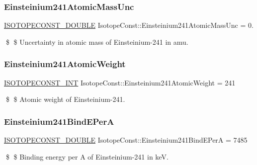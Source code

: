 \subsubsection{\texorpdfstring{Einsteinium241\+Atomic\+Mass\+Unc}{Einsteinium241AtomicMassUnc}}
{\footnotesize\ttfamily \mbox{\hyperlink{group___isotope_const-_macros_ga8f45a7272ce02c0b4c65c44636ed719a}{I\+S\+O\+T\+O\+P\+E\+C\+O\+N\+S\+T\+\_\+\+D\+O\+U\+B\+LE}} Isotope\+Const\+::\+Einsteinium241\+Atomic\+Mass\+Unc = 0.}

\$ \$ Uncertainty in atomic mass of Einsteinium-\/241 in amu. \mbox{\label{group___isotope_const-_einsteinium-_es241_gac3680f0d8534521733a6545f8fd40b84}} 
\subsubsection{\texorpdfstring{Einsteinium241\+Atomic\+Weight}{Einsteinium241AtomicWeight}}
{\footnotesize\ttfamily \mbox{\hyperlink{group___isotope_const-_macros_ga5f18360b3e99483a35c32d789e62621c}{I\+S\+O\+T\+O\+P\+E\+C\+O\+N\+S\+T\+\_\+\+I\+NT}} Isotope\+Const\+::\+Einsteinium241\+Atomic\+Weight = 241}

\$ \$ Atomic weight of Einsteinium-\/241. \mbox{\label{group___isotope_const-_einsteinium-_es241_ga2483653779a88902aa0848953613b377}} 
\subsubsection{\texorpdfstring{Einsteinium241\+Bind\+E\+PerA}{Einsteinium241BindEPerA}}
{\footnotesize\ttfamily \mbox{\hyperlink{group___isotope_const-_macros_ga8f45a7272ce02c0b4c65c44636ed719a}{I\+S\+O\+T\+O\+P\+E\+C\+O\+N\+S\+T\+\_\+\+D\+O\+U\+B\+LE}} Isotope\+Const\+::\+Einsteinium241\+Bind\+E\+PerA = 7485}

\$ \$ Binding energy per A of Einsteinium-\/241 in keV. \mbox{\label{group___isotope_const-_einsteinium-_es241_ga74fc582352db732ead8631717f1d8358}} 
